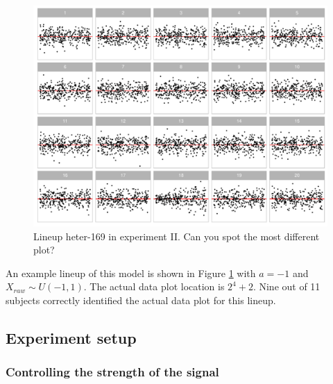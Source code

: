 \documentclass[]{interact}
\theoremstyle{plain}%
\theoremstyle{definition}
\theoremstyle{remark}
\begin{document}
\begin{figure}

{\centering \includegraphics[width=1\linewidth]{paper_comparison_files/figure-latex/example-heter-lineup-1} 

}

\caption{Lineup heter-169 in experiment II. Can you spot the most different plot? \label{fig:example-heter-lineup}}\label{fig:example-heter-lineup}
\end{figure}

An example lineup of this model is shown in Figure
\ref{fig:example-heter-lineup} with \(a = -1\) and
\(X_{raw} \sim U(-1, 1)\). The actual data plot location is \(2^4 + 2\).
Nine out of 11 subjects correctly identified the actual data plot for
this lineup.

\hypertarget{experiment-setup}{%
\subsection{Experiment setup}\label{experiment-setup}}

\hypertarget{controlling-the-strength-of-the-signal}{%
\subsubsection{Controlling the strength of the
signal}\label{controlling-the-strength-of-the-signal}}
\end{document}
